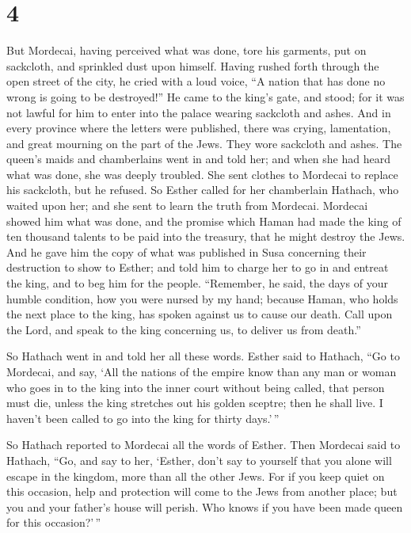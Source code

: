 \hypertarget{section-3}{%
\section{4}\label{section-3}}

 But Mordecai, having perceived what was done, tore his
garments, put on sackcloth, and sprinkled dust upon himself. Having
rushed forth through the open street of the city, he cried with a loud
voice, ``A nation that has done no wrong is going to be destroyed!''
 He came to the king's gate, and stood; for it was not
lawful for him to enter into the palace wearing sackcloth and ashes.
 And in every province where the letters were published,
there was crying, lamentation, and great mourning on the part of the
Jews. They wore sackcloth and ashes.  The queen's maids
and chamberlains went in and told her; and when she had heard what was
done, she was deeply troubled. She sent clothes to Mordecai to replace
his sackcloth, but he refused.  So Esther called for her
chamberlain Hathach, who waited upon her; and she sent to learn the
truth from Mordecai.  Mordecai showed him what was done,
and the promise which Haman had made the king of ten thousand talents to
be paid into the treasury, that he might destroy the Jews.
 And he gave him the copy of what was published in Susa
concerning their destruction to show to Esther; and told him to charge
her to go in and entreat the king, and to beg him for the people.
``Remember, he said, the days of your humble condition, how you were
nursed by my hand; because Haman, who holds the next place to the king,
has spoken against us to cause our death. Call upon the Lord, and speak
to the king concerning us, to deliver us from death.''

 So Hathach went in and told her all these words.
 Esther said to Hathach, ``Go to Mordecai, and say,
 `All the nations of the empire know than any man or
woman who goes in to the king into the inner court without being called,
that person must die, unless the king stretches out his golden sceptre;
then he shall live. I haven't been called to go into the king for thirty
days.'\,''

 So Hathach reported to Mordecai all the words of Esther.
 Then Mordecai said to Hathach, ``Go, and say to her,
`Esther, don't say to yourself that you alone will escape in the
kingdom, more than all the other Jews.  For if you keep
quiet on this occasion, help and protection will come to the Jews from
another place; but you and your father's house will perish. Who knows if
you have been made queen for this occasion?'\,''

